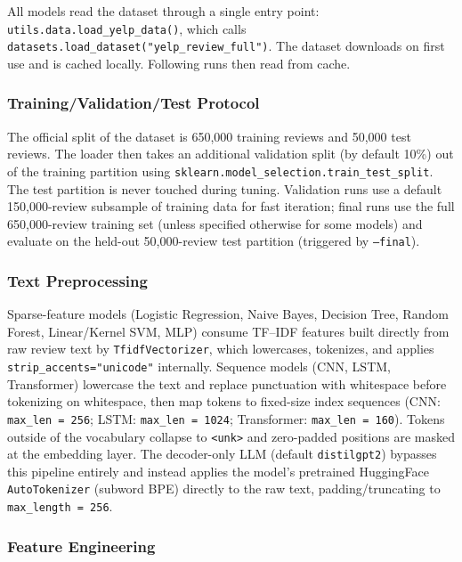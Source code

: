 \documentclass[12pt]{article}
\begin{document}
All models read the dataset through a single entry point: \texttt{utils.data.load\_yelp\_data()}, which calls \texttt{datasets.load\_dataset("yelp\_review\_full")}. The dataset downloads on first use and is cached locally. Following runs then read from cache.

\subsubsection{Training/Validation/Test Protocol}

The official split of the dataset is 650,000 training reviews and 50,000 test reviews. The loader then takes an additional validation split (by default 10\%) out of the training partition using \texttt{sklearn.model\_selection.train\_test\_split}. The test partition is never touched during tuning. Validation runs use a default 150,000-review subsample of training data for fast iteration; final runs use the full 650,000-review training set (unless specified otherwise for some models) and evaluate on the held-out 50,000-review test partition (triggered by \texttt{--final}).

\subsubsection{Text Preprocessing}

Sparse-feature models (Logistic Regression, Naive Bayes, Decision Tree, Random Forest, Linear/Kernel SVM, MLP) consume TF--IDF features built directly from raw review text by \texttt{TfidfVectorizer}, which lowercases, tokenizes, and applies \texttt{strip\_accents="unicode"} internally. Sequence models (CNN, LSTM, Transformer) lowercase the text and replace punctuation with whitespace before tokenizing on whitespace, then map tokens to fixed-size index sequences (CNN: \texttt{max\_len = 256};  LSTM: \texttt{max\_len = 1024}; Transformer: \texttt{max\_len = 160}). Tokens outside of the vocabulary collapse to \texttt{<unk>} and zero-padded positions are masked at the embedding layer. The decoder-only LLM (default \texttt{distilgpt2}) bypasses this pipeline entirely and instead applies the model's pretrained HuggingFace \texttt{AutoTokenizer} (subword BPE) directly to the raw text, padding/truncating to \texttt{max\_length = 256}.

\subsubsection{Feature Engineering}
\end{document}
